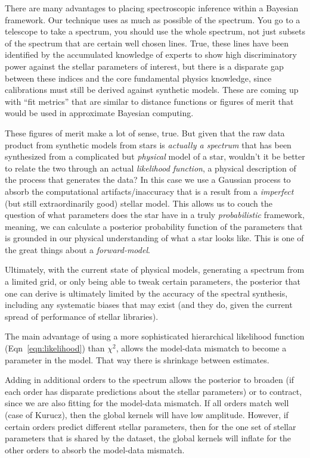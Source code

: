 \documentclass[iop,floatfix]{emulateapj}
\begin{document}
There are many advantages to placing spectroscopic inference within a Bayesian framework. Our technique uses as much as possible of the spectrum. You go to a telescope to take a spectrum, you should use the whole spectrum, not just subsets of the spectrum that are certain well chosen lines. True, these lines have been identified by the accumulated knowledge of experts to show high discriminatory power against the stellar parameters of interest, but there is a disparate gap between these indices and the core fundamental physics knowledge, since calibrations must still be derived against synthetic models. These are coming up with ``fit metrics'' that are similar to distance functions or figures of merit that would be used in approximate Bayesian computing.

These figures of merit make a lot of sense, true. But given that the raw data product from synthetic models from stars is \emph{actually a spectrum} that has been synthesized from a complicated but \emph{physical} model of a star, wouldn't it be better to relate the two through an actual \emph{likelihood function}, a physical description of the process that generates the data? In this case we use a Gaussian process to absorb the computational artifacts/inaccuracy that is a result from a \emph{imperfect} (but still extraordinarily good) stellar model. This allows us to couch the question of what parameters does the star have in a truly \emph{probabilistic} framework, meaning, we can calculate a posterior probability function of the parameters that is grounded in our physical understanding of what a star looks like. This is one of the great things about a \emph{forward-model}.

Ultimately, with the current state of physical models, generating a spectrum from a limited grid, or only being able to tweak certain parameters, the posterior that one can derive is ultimately limited by the accuracy of the spectral synthesis, including any systematic biases that may exist (and they do, given the current spread of performance of stellar libraries). 

The main advantage of using a more sophisticated hierarchical likelihood function (Eqn~\ref{eqn:likelihood}) than $\chi^2$, allows the model-data mismatch to become a parameter in the model. That way there is shrinkage between estimates.

Adding in additional orders to the spectrum allows the posterior to broaden (if each order has disparate predictions about the stellar parameters) or to contract, since we are also fitting for the model-data mismatch. If all orders match well (case of Kurucz), then the global kernels will have low amplitude. However, if certain orders predict different stellar parameters, then for the one set of stellar parameters that is shared by the dataset, the global kernels will inflate for the other orders to absorb the model-data mismatch.
\end{document}
